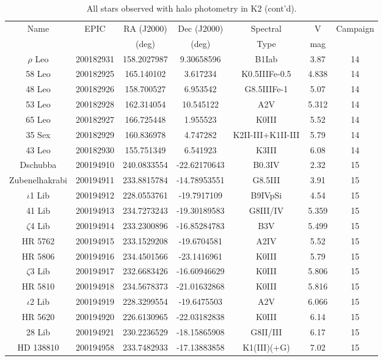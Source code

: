 \begin{table*}
\caption{All stars observed with halo photometry in K2 (cont'd).}
\begin{tabular}{ccccccc}
\hline \hline
Name & EPIC & RA (J2000) & Dec (J2000) & Spectral & V & Campaign \\
 &  & (deg) & (deg) & Type & mag &  \\
\hline
$\rho$ Leo & 200182931 & 158.2027987 & 9.30658596 & B1Iab & 3.87 & 14 \\
58 Leo & 200182925 & 165.140102 & 3.617234 & K0.5IIIFe-0.5 & 4.838 & 14 \\
48 Leo & 200182926 & 158.700527 & 6.953542 & G8.5IIIFe-1 & 5.07 & 14 \\
53 Leo & 200182928 & 162.314054 & 10.545122 & A2V & 5.312 & 14 \\
65 Leo & 200182927 & 166.725448 & 1.955523 & K0III & 5.52 & 14 \\
35 Sex & 200182929 & 160.836978 & 4.747282 & K2II-III+K1II-III & 5.79 & 14 \\
43 Leo & 200182930 & 155.751349 & 6.541923 & K3III & 6.08 & 14 \\
Dschubba & 200194910 & 240.0833554 & -22.62170643 & B0.3IV & 2.32 & 15 \\
Zubenelhakrabi & 200194911 & 233.8815784 & -14.78953551 & G8.5III & 3.91 & 15 \\
$\iota$1 Lib & 200194912 & 228.0553761 & -19.7917109 & B9IVpSi & 4.54 & 15 \\
41 Lib & 200194913 & 234.7273243 & -19.30189583 & G8III/IV & 5.359 & 15 \\
$\zeta$4 Lib & 200194914 & 233.2300896 & -16.85284783 & B3V & 5.499 & 15 \\
HR 5762 & 200194915 & 233.1529208 & -19.6704581 & A2IV & 5.52 & 15 \\
HR 5806 & 200194916 & 234.4501566 & -23.1416961 & K0III & 5.79 & 15 \\
$\zeta$3 Lib & 200194917 & 232.6683426 & -16.60946629 & K0III & 5.806 & 15 \\
HR 5810 & 200194918 & 234.5678373 & -21.01632868 & K0III & 5.816 & 15 \\
$\iota$2 Lib & 200194919 & 228.3299554 & -19.6475503 & A2V & 6.066 & 15 \\
HR 5620 & 200194920 & 226.6130965 & -22.03182838 & K0III & 6.14 & 15 \\
28 Lib & 200194921 & 230.2236529 & -18.15865908 & G8II/III & 6.17 & 15 \\
HD 138810 & 200194958 & 233.7482933 & -17.13883858 & K1(III)(+G) & 7.02 & 15 \\

\end{tabular}
\end{table*}
